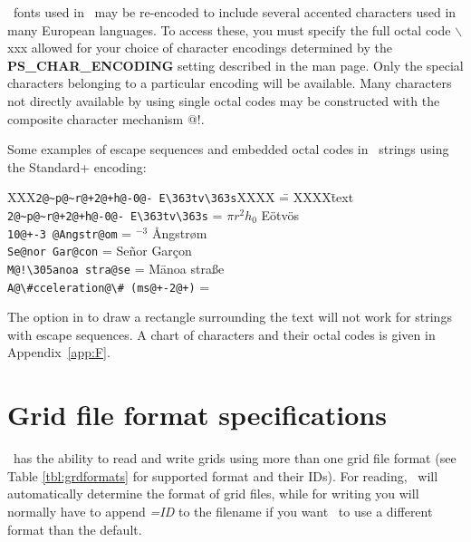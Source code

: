 \PS\ fonts used in \GMT\ may be re-encoded to include
several accented characters used in many European languages.  To
access these, you must specify the full octal code $\backslash$xxx
allowed for your choice of character encodings
determined by the \textbf{PS\_CHAR\_ENCODING} setting described
in the  man page.  Only the special characters
belonging to a particular encoding will
be available.  Many characters not directly available by
using single octal codes may be constructed with the composite
character mechanism @!.

Some examples of escape sequences and embedded octal codes in \GMT\ strings using the
Standard+ encoding:

\begin{tabbing}
XXX\=\verb|2@~p@~r@+2@+h@-0@- E\363tv\363s|XXXX \== XXXX\=text \kill
\>\verb|2@~p@~r@+2@+h@-0@- E\363tv\363s| \> = $\pi r^2h_0$ E\"{o}tv\"{o}s \\
\>\verb|10@+-3 @Angstr@om|		 \> =	$^{-3}$ \AA ngstr\o m \\
\>\verb|Se@nor Gar@con|	 \> = \> Se\~{n}or Gar\c{c}on \\
\>\verb|M@!\305anoa stra@se|	 \> = \> M\={a}noa stra\ss e \\
\>\verb|A@\#cceleration@\# (ms@+-2@+)|	 \> = \> 
\end{tabbing}

The option in  to draw a rectangle surrounding the text
will not work for strings with escape sequences.  A chart of characters
and their octal codes is given in Appendix~\ref{app:F}.

\section{Grid file format specifications}
\label{sec:grdformats}
\GMT\ has the ability to read and write grids using more than one grid file
format (see Table \ref{tbl:grdformats} for supported format and their IDs).  For
reading, \GMT\ will automatically determine the format of grid files, while for writing
you will normally have to append \emph{=ID} to the filename if you want \GMT\ to use a different format
than the default.

